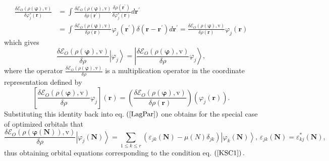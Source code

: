\documentclass[aps,preprint]{revtex4}%
\begin{document}
\begin{align}
\frac{\delta\mathcal{E}_{O}\left(  \rho\left(  \boldsymbol{\varphi}\right)
\boldsymbol{,}\mathrm{v}\right)  }{\delta\varphi_{j}^{\ast}\left(
\boldsymbol{r}\right)  }  &  =\int\frac{\delta\mathcal{E}_{O}\left(
\rho\left(  \boldsymbol{\varphi}\right)  \boldsymbol{,}\mathrm{v}\right)
}{\delta\rho\left(  \boldsymbol{r}^{\prime}\right)  }\frac{\delta\rho\left(
\boldsymbol{r}^{\prime}\right)  }{\delta\varphi_{j}^{\ast}\left(
\boldsymbol{r}\right)  }d\boldsymbol{r}^{\prime}\nonumber\\
&  =\int\frac{\delta\mathcal{E}_{O}\left(  \rho\left(  \boldsymbol{\varphi
}\right)  \boldsymbol{,}\mathrm{v}\right)  }{\delta\rho\left(  \boldsymbol{r}%
\right)  }\varphi_{j}\left(  \boldsymbol{r}^{\prime}\right)  \delta\left(
\boldsymbol{r-r}^{\prime}\right)  d\boldsymbol{r}^{\prime}=\frac
{\delta\mathcal{E}_{O}\left(  \rho\left(  \boldsymbol{\varphi}\right)
\boldsymbol{,}\mathrm{v}\right)  }{\delta\rho\left(  \boldsymbol{r}\right)
}\varphi_{j}\left(  \boldsymbol{r}\right)
\end{align}
which gives
\begin{equation}
\frac{\delta\mathcal{E}_{O}\left(  \rho\left(  \boldsymbol{\varphi}\right)
\boldsymbol{,}\mathrm{v}\right)  }{\delta\rho}\left\vert \varphi
_{j}\right\rangle =\left\vert \frac{\delta\mathcal{E}_{O}\left(  \rho\left(
\boldsymbol{\varphi}\right)  \boldsymbol{,}\mathrm{v}\right)  }{\delta\rho
}\varphi_{j}\right\rangle ,
\end{equation}
where the operator $\frac{\delta\mathcal{E}_{O}\left(  \rho\left(
\boldsymbol{\varphi}\right)  \boldsymbol{,}\mathrm{v}\right)  }{\delta\rho}$
is a multiplication operator in the coordinate representation defined by
\begin{equation}
\left[  \frac{\delta\mathcal{E}_{O}\left(  \rho\left(  \boldsymbol{\varphi
}\right)  \boldsymbol{,}\mathrm{v}\right)  }{\delta\rho}\varphi_{j}\right]
\left(  \boldsymbol{r}\right)  =\left(  \frac{\delta\mathcal{E}_{O}\left(
\rho\left(  \boldsymbol{\varphi}\right)  \boldsymbol{,}\mathrm{v}\right)
}{\delta\rho\left(  \boldsymbol{r}\right)  }\right)  \left(  \varphi
_{j}\left(  \boldsymbol{r}\right)  \right)  .
\end{equation}
Substituting this identity back into eq. $\left(  \ref{LagPar}\right)  $ one
obtains for the special case of optimized orbitals that%
\begin{equation}
\frac{\delta\mathcal{E}_{O}\left(  \rho\left(  \boldsymbol{\varphi\left(
\boldsymbol{N}\right)  }\right)  \boldsymbol{,}\mathrm{v}\right)  }{\delta
\rho}\left\vert \varphi_{j}\left(  \boldsymbol{N}\right)  \right\rangle
=\sum_{1\leq k\leq r}\left(  \varepsilon_{jk}\left(  \boldsymbol{N}\right)
-\mu\left(  N\right)  \delta_{jk}\right)  \left\vert \varphi_{k}\left(
\boldsymbol{N}\right)  \right\rangle ,\,\varepsilon_{jk}\left(  \boldsymbol{N}%
\right)  =\varepsilon_{kj}^{\ast}\left(  \boldsymbol{N}\right)  ,
\label{FockEq}%
\end{equation}
thus obtaining orbital equations corresponding to the condition eq. $\left(
\ref{KSC1}\right)  .$
\end{document}
